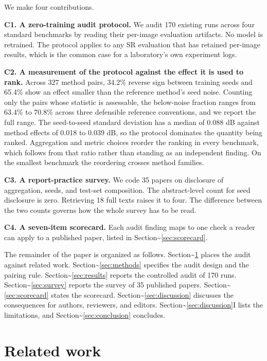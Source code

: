 \documentclass{interact}
\begin{document}
We make four contributions.

\textbf{C1. A zero-training audit protocol.} We audit 170 existing runs across four standard benchmarks by reading their per-image evaluation artifacts. No model is retrained. The protocol applies to any SR evaluation that has retained per-image results, which is the common case for a laboratory's own experiment logs.

\textbf{C2. A measurement of the protocol against the effect it is used to rank.} Across 327 method pairs, 34.2\% reverse sign between training seeds and 65.4\% show an effect smaller than the reference method's seed noise. Counting only the pairs whose statistic is assessable, the below-noise fraction ranges from 63.4\% to 70.8\% across three defensible reference conventions, and we report the full range. The seed-to-seed standard deviation has a median of 0.088 dB against method effects of 0.018 to 0.039 dB, so the protocol dominates the quantity being ranked. Aggregation and metric choices reorder the ranking in every benchmark, which follows from that ratio rather than standing as an independent finding. On the smallest benchmark the reordering crosses method families.

\textbf{C3. A report-practice survey.} We code 35 papers on disclosure of aggregation, seeds, and test-set composition. The abstract-level count for seed disclosure is zero. Retrieving 18 full texts raises it to four. The difference between the two counts governs how the whole survey has to be read.

\textbf{C4. A seven-item scorecard.} Each audit finding maps to one check a reader can apply to a published paper, listed in Section\textasciitilde{}\ref{sec:scorecard}.

The remainder of the paper is organized as follows. Section\textasciitilde{}\ref{sec:related} places the audit against related work. Section\textasciitilde{}\ref{sec:methods} specifies the audit design and the pairing rule. Section\textasciitilde{}\ref{sec:results} reports the controlled audit of 170 runs. Section\textasciitilde{}\ref{sec:survey} reports the survey of 35 published papers. Section\textasciitilde{}\ref{sec:scorecard} states the scorecard. Section\textasciitilde{}\ref{sec:discussion} discusses the consequences for authors, reviewers, and editors. Section\textasciitilde{}\ref{sec:discussion}I lists the limitations, and Section\textasciitilde{}\ref{sec:conclusion} concludes.

\section{Related work}\label{sec:related}
\end{document}
